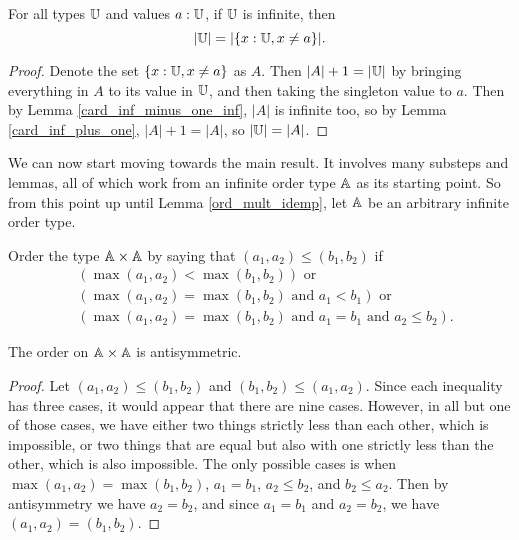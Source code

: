 \documentclass[../../math.tex]{subfiles}
\begin{document}
\begin{lemma} \label{card_inf_remove_one}
    For all types $\mathbb{U}$ and values $a : \mathbb{U}$, if $\mathbb{U}$ is infinite, then
    \[
        |\mathbb{U}| = |\{x : \mathbb{U}, x \neq a\}|.
    \]
\end{lemma}
\begin{proof}
    Denote the set $\{x : \mathbb{U}, x \neq a\}$ as $A$.  Then $|A| + 1 = |\mathbb{U}|$ by
    bringing everything in $A$ to its value in $\mathbb{U}$, and then taking the
    singleton value to $a$.  Then by Lemma \ref{card_inf_minus_one_inf}, $|A|$
    is infinite too, so by Lemma \ref{card_inf_plus_one}, $|A| + 1 = |A|$, so
    $|\mathbb{U}| = |A|$.
\end{proof}

We can now start moving towards the main result.  It involves many substeps and
lemmas, all of which work from an infinite order type $\mathbb{A}$ as its starting
point.  So from this point up until Lemma \ref{ord_mult_idemp}, let $\mathbb{A}$ be an
arbitrary infinite order type.

\begin{instance}
    Order the type $\mathbb{A} \times \mathbb{A}$ by saying that $(a_1, a_2) \leq (b_1, b_2)$ if
    \begin{align*}
        &(\max(a_1, a_2) < \max(b_1, b_2)) \text{ or} \\
        &(\max(a_1, a_2) = \max(b_1, b_2) \text{ and } a_1 < b_1) \text{ or} \\
        &(\max(a_1, a_2) = \max(b_1, b_2) \text{ and } a_1 = b_1 \text{ and }
            a_2 \leq b_2).
    \end{align*}
\end{instance}

\begin{instance}
    The order on $\mathbb{A} \times \mathbb{A}$ is antisymmetric.
\end{instance}
\begin{proof}
    Let $(a_1, a_2) \leq (b_1, b_2)$ and $(b_1, b_2) \leq (a_1, a_2)$.  Since
    each inequality has three cases, it would appear that there are nine cases.
    However, in all but one of those cases, we have either two things strictly
    less than each other, which is impossible, or two things that are equal but
    also with one strictly less than the other, which is also impossible.  The
    only possible cases is when $\max(a_1, a_2) = \max(b_1, b_2)$, $a_1 = b_1$,
    $a_2 \leq b_2$, and $b_2 \leq a_2$.  Then by antisymmetry we have $a_2 =
    b_2$, and since $a_1 = b_1$ and $a_2 = b_2$, we have $(a_1, a_2) = (b_1,
    b_2)$.
\end{proof}
\end{document}
